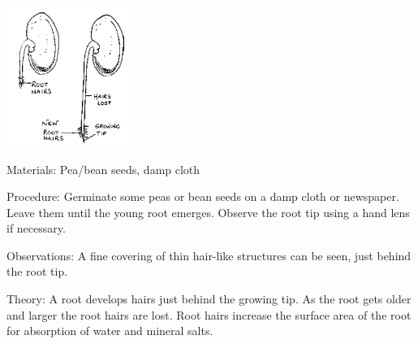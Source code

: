 \begin{multicols}{2}
\begin{center}
\includegraphics[width=0.3\textwidth]{./img/source/root-hairs.png}
\end{center}

\begin{description*}
\item[Materials:]{Pea/bean seeds, damp cloth}
\item[Procedure:]{Germinate some peas or bean seeds on a damp cloth or newspaper. Leave them until the
young root emerges. Observe the root tip using a hand lens if necessary.}
\item[Observations:]{A fine covering of thin hair-like structures can be seen, just behind the root tip.}
\item[Theory:]{A root develops hairs just behind the growing tip. As the root gets older and larger the root
hairs are lost. Root hairs increase the surface area of the root for absorption of water and
mineral salts.}
\end{description*}


\end{multicols}

